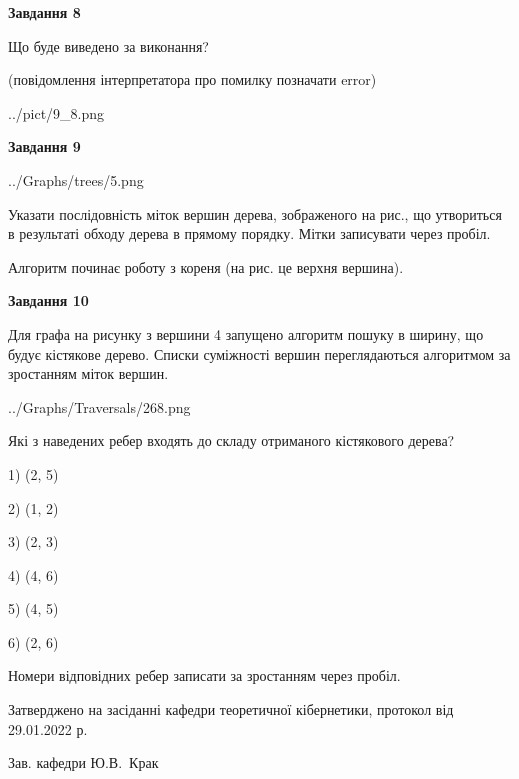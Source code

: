 \documentclass[12pt, ukrainian]{article}
\begin{document}
{\begin {large}
{\begin {center}\textbf{Завдання 8}\end {center}}\par
Що буде виведено за виконання?\par
 (повідомлення інтерпретатора про помилку позначати error)\par
\begin{center}
	{../pict/9_8.png}
\end{center}
\newpage

{\begin {center}\textbf{Завдання 9}\end {center}}\par

\begin{center}
	{../Graphs/trees/5.png}
\end{center}
Указати послідовність міток вершин дерева, зображеного на рис., що утвориться в результаті обходу дерева в прямому порядку. Мітки записувати через пробіл.\par Алгоритм починає роботу з кореня (на рис. це верхня вершина).\par
\newpage

{\begin {center}\textbf{Завдання 10}\end {center}}\par
Для графа на рисунку з вершини 4 запущено алгоритм пошуку в ширину, що будує кістякове дерево. Списки суміжності вершин переглядаються алгоритмом за зростанням міток вершин.\par
\begin{center}
	{../Graphs/Traversals/268.png}
\end{center}
\par Які з наведених ребер входять до складу отриманого кістякового дерева?\par
1) (2, 5)\par
2) (1, 2)\par
3) (2, 3)\par
4) (4, 6)\par
5) (4, 5)\par
6) (2, 6)\par
{\vskip 15pt} Номери відповідних ребер записати за зростанням через пробіл.\par
\newpage


\end {large}
}
{\smallskip \begin {small} Затверджено на засіданні кафедри теоретичної кібернетики, протокол  від   29.01.2022 р.\par\smallskip\smallskip
{\parbox {6.5 cm}{Зав. кафедри \dotfill Ю.В.~Крак}} \end{small}}
\end{document}
